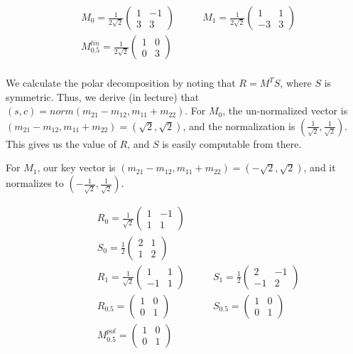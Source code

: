 \documentclass{letter}
\begin{document}
\begin{align*} 
& M_0 = 
\frac{1}{2\sqrt{2}}
\begin{pmatrix}
1 & -1 \\
3 & 3 
\end{pmatrix} 
\quad \quad 
& M_1 = 
\frac{1}{2\sqrt{2}}
\begin{pmatrix} 
1 & 1 \\
-3 & 3 
\end{pmatrix} \\
& M_{0.5}^{lin} = 
\frac{1}{2\sqrt{2}} 
\begin{pmatrix} 
1 & 0 \\
0 & 3
\end{pmatrix} \\
\end{align*}

We calculate the polar decomposition by noting that $R = M^TS$, where $S$ is symmetric. Thus, we derive (in lecture) that $(s, c) = norm(m_{21} - m_{12}, m_{11} + m_{22})$. For $M_0$, the un-normalized vector is $(m_{21} - m_{12}, m_{11} + m_{22}) = (\sqrt{2}, \sqrt{2})$, and the normalization is $(\frac{1}{\sqrt{2}}, \frac{1}{\sqrt{2}})$. This gives us the value of $R$, and $S$ is easily computable from there. 

For $M_1$, our key vector is $(m_{21} - m_{12}, m_{11} + m_{22}) = (-\sqrt{2}, \sqrt{2})$, and it normalizes to $(-\frac{1}{\sqrt{2}}, \frac{1}{\sqrt{2}})$. 

\begin{align*} 
& R_0 = 
\frac{1}{\sqrt{2}}
\begin{pmatrix}
1 & -1\\
1 & 1
\end{pmatrix} \\
\quad \quad
& S_0 = 
\frac{1}{2}
\begin{pmatrix}
2 & 1 \\
1 & 2
\end{pmatrix} \\
& R_1 = 
\frac{1}{\sqrt{2}} 
\begin{pmatrix}
1 & 1 \\
-1 & 1
\end{pmatrix}
\quad \quad 
& S_1 = 
\frac{1}{2}
\begin{pmatrix}
2 & -1 \\
-1 & 2
\end{pmatrix} \\ 
& R_{0.5} = 
\begin{pmatrix}
1 & 0 \\
0 & 1
\end{pmatrix}
& S_{0.5} = 
\begin{pmatrix} 
1 & 0 \\
0 & 1
\end{pmatrix} \\
& M_{0.5}^{pol} = 
\begin{pmatrix}
1 & 0 \\
0 & 1
\end{pmatrix} 
\end{align*}
\end{document}
